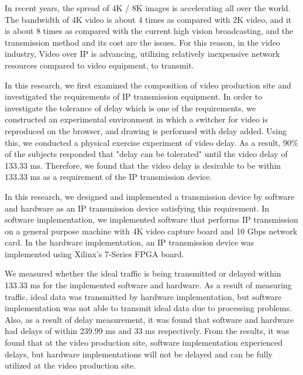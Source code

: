 \begin{jabstract}


\end{jabstract}


\begin{eabstract}

In recent years, the spread of 4K / 8K images is accelerating all over the world.
The bandwidth of 4K video is about 4 times as compared with 2K video, and it is about 8 times as compared with the current high vision broadcasting, and the transmission method and its cost are the issues.
For this reason, in the video industry, Video over IP is advancing, utilizing relatively inexpensive network resources compared to video equipment, to transmit.

In this research, we first examined the composition of video production site and investigated the requirements of IP transmission equipment.
In order to investigate the tolerance of delay which is one of the requirements, we constructed an experimental environment in which a switcher for video is reproduced on the browser, and drawing is performed with delay added.
Using this, we conducted a physical exercise experiment of video delay. As a result, 90\% of the subjects responded that "delay can be tolerated" until the video delay of 133.33 ms.
Therefore, we found that the video delay is desirable to be within 133.33 ms as a requirement of the IP transmission device.

In this research, we designed and implemented a transmission device by software and hardware as an IP transmission device satisfying this requirement.
In software implementation, we implemented software that performs IP transmission on a general purpose machine with 4K video capture board and 10 Gbps network card.
In the hardware implementation, an IP transmission device was implemented using Xilinx's 7-Series FPGA board.

We measured whether the ideal traffic is being transmitted or delayed within 133.33 ms for the implemented software and hardware.
As a result of measuring traffic, ideal data was transmitted by hardware implementation, but software implementation was not able to transmit ideal data due to processing problems.
Also, as a result of delay measurement, it was found that software and hardware had delays of within 239.99 ms and 33 ms respectively.
From the results, it was found that at the video production site, software implementation experienced delays, but hardware implementations will not be delayed and can be fully utilized at the video production site.

\end{eabstract}

